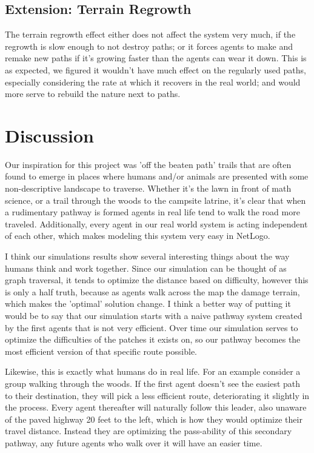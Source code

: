 \documentclass[conference]{IEEEtran}
\begin{document}
\subsection{Extension: Terrain Regrowth}
The terrain regrowth effect either does not affect the system very much, if the regrowth is slow enough to not destroy paths; or it forces agents to make and remake new paths if it's growing faster than the agents can wear it down. This is as expected, we figured it wouldn't have much effect on the regularly used paths, especially considering the rate at which it recovers in the real world; and would more serve to rebuild the nature next to paths. 


\section{Discussion} 
	Our inspiration for this project was 'off the beaten path' trails that are often found to emerge in places where humans and/or animals are presented with some non-descriptive landscape to traverse. Whether it's the lawn in front of math science, or a trail through the woods to the campsite latrine, it's clear that when a rudimentary pathway is formed agents in real life tend to walk the road more traveled. Additionally, every agent in our real world system is acting independent of each other, which makes modeling this system very easy in NetLogo. 
	
	I think our simulations results show several interesting things about the way humans think and work together. Since our simulation can be thought of as graph traversal, it tends to optimize the distance based on difficulty, however this is only a half truth, because as agents walk across the map the damage terrain, which makes the 'optimal' solution change. I think a better way of putting it would be to say that our simulation starts with a naive pathway system created by the first agents that is not very efficient. Over time our simulation serves to optimize the difficulties of the patches it exists on, so our pathway becomes the most efficient version of that specific route possible.
	
Likewise, this is exactly what humans do in real life. For an example consider a group walking through the woods. If the first agent doesn't see the easiest path to their destination, they will pick a less efficient route, deteriorating it slightly in the process. Every agent thereafter will naturally follow this leader, also unaware of the paved highway 20 feet to the left, which is how they would optimize their travel distance. Instead they are optimizing the pass-ability of this secondary pathway, any future agents who walk over it will have an easier time.
\end{document}

